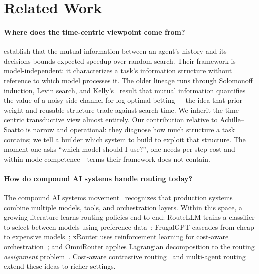 \section{Related Work}
\label{sec:related}

\paragraph{Where does the time-centric viewpoint come from?}
\citet{achille2025agents} establish that the mutual information between an agent's history and its decisions bounds expected speedup over random search.
Their framework is model-independent: it characterizes a task's information structure without reference to which model processes it.
The older lineage runs through Solomonoff induction, Levin search, and Kelly's~\citeyearpar{kelly1956new} result that mutual information quantifies the value of a noisy side channel for log-optimal betting~\citep{cover2006elements}---the idea that prior weight and reusable structure trade against search time.
We inherit the time-centric transductive view almost entirely.
Our contribution relative to Achille--Soatto is narrow and operational: they diagnose how much structure a task contains; we tell a builder which system to build to exploit that structure.
The moment one asks ``which model should I use?'', one needs per-step cost and within-mode competence---terms their framework does not contain.

\paragraph{How do compound AI systems handle routing today?}
The compound AI systems movement~\citep{zaharia2024compound,wen2025compound} recognizes that production systems combine multiple models, tools, and orchestration layers.
Within this space, a growing literature learns routing policies end-to-end: RouteLLM trains a classifier to select between models using preference data~\citep{ong2024routellm}; FrugalGPT cascades from cheap to expensive models~\citep{chen2023frugalgpt}; xRouter uses reinforcement learning for cost-aware orchestration~\citep{xrouter2024}; and OmniRouter applies Lagrangian decomposition to the routing \emph{assignment} problem~\citep{omnirouter2025}.
Cost-aware contrastive routing~\citep{cscr2025} and multi-agent routing~\citep{masrouter2025} extend these ideas to richer settings.


